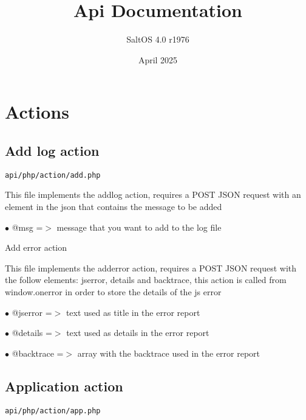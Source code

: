 \documentclass[a4paper]{article}
\title{Api Documentation}
\author{SaltOS 4.0 r1976}
\begin{document}
\date{April 2025}
\maketitle
\clearpage

\tableofcontents
\clearpage


\hypertarget{toc1}{}
\section{Actions}

\hypertarget{toc2}{}
\subsection{Add log action}

\begin{lstlisting}
api/php/action/add.php
\end{lstlisting}

This file implements the addlog action, requires a POST JSON request
with an element in the json that contains the message to be added

\begin{compactitem}
\item[\color{myblue}$\bullet$] @msg =$>$ message that you want to add to the log file
\end{compactitem}

Add error action

This file implements the adderror action, requires a POST JSON request
with the follow elements: jserror, details and backtrace, this action
is called from window.onerror in order to store the details of the js
error

\begin{compactitem}
\item[\color{myblue}$\bullet$] @jserror   =$>$ text used as title in the error report
\item[\color{myblue}$\bullet$] @details   =$>$ text used as details in the error report
\item[\color{myblue}$\bullet$] @backtrace =$>$ array with the backtrace used in the error report
\end{compactitem}

\hypertarget{toc3}{}
\subsection{Application action}

\begin{lstlisting}
api/php/action/app.php
\end{lstlisting}
\end{document}
